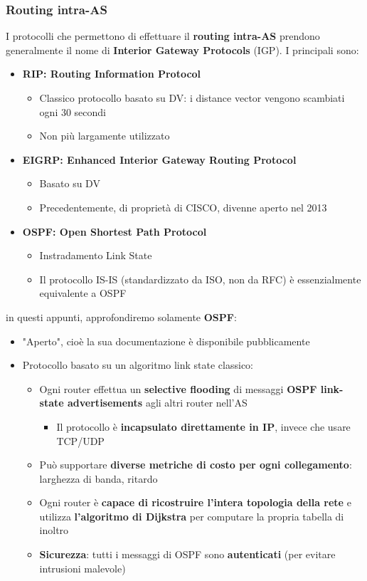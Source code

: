 \documentclass[12pt]{article}
\begin{document}
\subsubsection{Routing intra-AS}
I protocolli che permettono di effettuare il \textbf{routing intra-AS} prendono generalmente il nome di \textbf{Interior Gateway Protocols} (IGP).
I principali sono:
\begin{itemize}
    \item \textbf{RIP: Routing Information Protocol}
    \begin{itemize}
        \item Classico protocollo basato su DV: i distance vector vengono scambiati ogni 30 secondi
        \item Non più largamente utilizzato
    \end{itemize}
    \item \textbf{EIGRP: Enhanced Interior Gateway Routing Protocol}
    \begin{itemize}
        \item Basato su DV
        \item Precedentemente, di proprietà di CISCO, divenne aperto nel 2013
    \end{itemize}
    \item \textbf{OSPF: Open Shortest Path Protocol}
    \begin{itemize}
        \item Instradamento Link State
        \item Il protocollo IS-IS (standardizzato da ISO, non da RFC) è essenzialmente equivalente a OSPF
    \end{itemize}
\end{itemize}
in questi appunti, approfondiremo solamente \textbf{OSPF}:
\begin{itemize}
    \item "Aperto", cioè la sua documentazione è disponibile pubblicamente
    \item Protocollo basato su un algoritmo link state classico:
    \begin{itemize}
        \item Ogni router effettua un \textbf{selective flooding} di messaggi \textbf{OSPF link-state advertisements} agli altri router nell'AS
        \begin{itemize}
            \item Il protocollo è \textbf{incapsulato direttamente in IP}, invece che usare TCP/UDP
        \end{itemize}
        \item Può supportare \textbf{diverse metriche di costo per ogni collegamento}: larghezza di banda, ritardo
        \item Ogni router è \textbf{capace di ricostruire l'intera topologia della rete} e utilizza \textbf{l'algoritmo di Dijkstra} per computare la propria tabella di inoltro
        \item \textbf{Sicurezza}: tutti i messaggi di OSPF sono \textbf{autenticati} (per evitare intrusioni malevole)
    \end{itemize}
\end{itemize}
\end{document}
